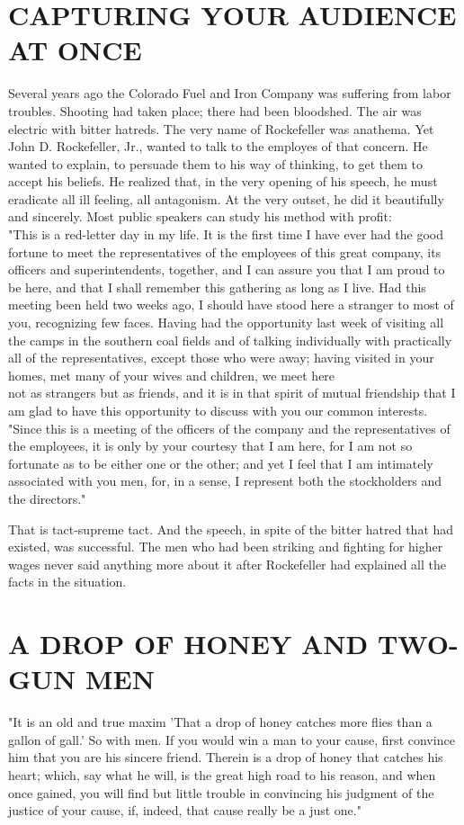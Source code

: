 \documentclass[10pt]{article}
\begin{document}
\section*{CAPTURING YOUR AUDIENCE AT ONCE}
Several years ago the Colorado Fuel and Iron Company was suffering from labor troubles. Shooting had taken place; there had been bloodshed. The air was electric with bitter hatreds. The very name of Rockefeller was anathema. Yet John D. Rockefeller, Jr., wanted to talk to the employes of that concern. He wanted to explain, to persuade them to his way of thinking, to get them to accept his beliefs. He realized that, in the very opening of his speech, he must eradicate all ill feeling, all antagonism. At the very outset, he did it beautifully and sincerely. Most public speakers can study his method with profit:\\
"This is a red-letter day in my life. It is the first time I have ever had the good fortune to meet the representatives of the employees of this great company, its officers and superintendents, together, and I can assure you that I am proud to be here, and that I shall remember this gathering as long as I live. Had this meeting been held two weeks ago, I should have stood here a stranger to most of you, recognizing few faces. Having had the opportunity last week of visiting all the camps in the southern coal fields and of talking individually with practically all of the representatives, except those who were away; having visited in your homes, met many of your wives and children, we meet here\\
not as strangers but as friends, and it is in that spirit of mutual friendship that I am glad to have this opportunity to discuss with you our common interests.\\
"Since this is a meeting of the officers of the company and the representatives of the employees, it is only by your courtesy that I am here, for I am not so fortunate as to be either one or the other; and yet I feel that I am intimately associated with you men, for, in a sense, I represent both the stockholders and the directors."

That is tact-supreme tact. And the speech, in spite of the bitter hatred that had existed, was successful. The men who had been striking and fighting for higher wages never said anything more about it after Rockefeller had explained all the facts in the situation.

\section*{A DROP OF HONEY AND TWO-GUN MEN}
"It is an old and true maxim 'That a drop of honey catches more flies than a gallon of gall.' So with men. If you would win a man to your cause, first convince him that you are his sincere friend. Therein is a drop of honey that catches his heart; which, say what he will, is the great high road to his reason, and when once gained, you will find but little trouble in convincing his judgment of the justice of your cause, if, indeed, that cause really be a just one."
\end{document}
